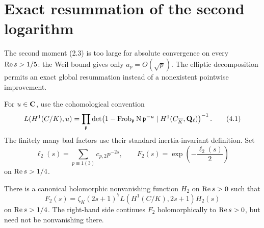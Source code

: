 \section{Exact resummation of the second logarithm}\label{sec:resummation}

The second moment (2.3) is too large for absolute convergence on every
\(\operatorname{Re} s>1/5\): the Weil bound gives only
\(a_p=O(\sqrt p)\).  The elliptic decomposition permits an exact global
resummation instead of a nonexistent pointwise improvement.

For \(u\in\mathbf C\), use the cohomological convention
\[
 L(H^1(C/K),u)=
 \prod_{\mathfrak p}
 \det\!\left(
 1-\operatorname{Frob}_{\mathfrak p}\operatorname{N}\mathfrak p^{-u}
 \mid H^1(C_{\overline K},\mathbf Q_\ell)
 \right)^{-1}.                                         \tag{4.1}
\]
The finitely many bad factors use their standard inertia-invariant
definition.  Set
\[
 \ell_2(s)=\sum_{p\equiv1(3)}c_{p,2}p^{-2s},
 \qquad F_2(s)=\exp\!\left(-\frac{\ell_2(s)}2\right)     \tag{4.2}
\]
on \(\operatorname{Re} s>1/4\).

\begin{theorem}\label{thm:second-extraction}
There is a canonical holomorphic nonvanishing function \(H_2\) on
\(\operatorname{Re} s>0\) such that
\[
 F_2(s)=
 \zeta_K(2s+1)^7L(H^1(C/K),2s+1)H_2(s)                 \tag{4.3}
\]
on \(\operatorname{Re} s>1/4\).  The right-hand side continues \(F_2\)
holomorphically to \(\operatorname{Re} s>0\), but need not be nonvanishing there.
\end{theorem}

